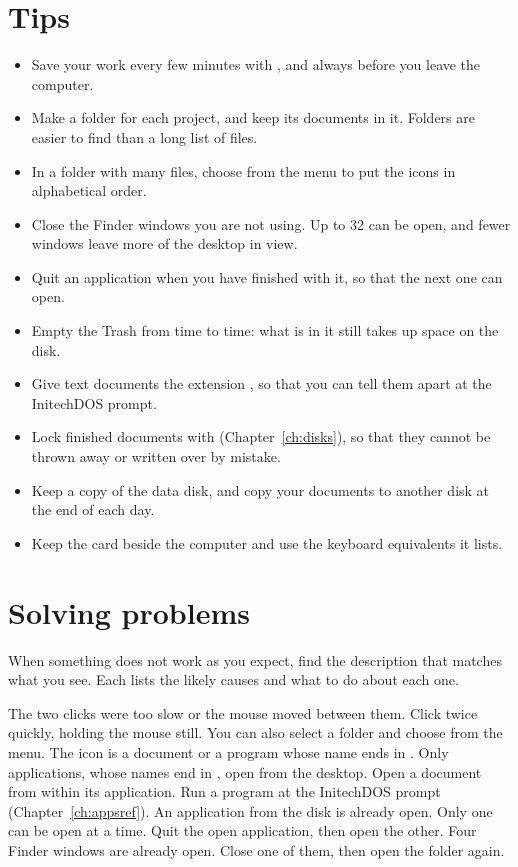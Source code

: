 \section{Tips}
\begin{itemize}
\item Save your work every few minutes with , and always
  before you leave the computer.
\item Make a folder for each project, and keep its documents in it.
  Folders are easier to find than a long list of files.
\item In a folder with many files, choose 
  from the  menu to put the icons in alphabetical order.
\item Close the Finder windows you are not using.  Up to 32 can be
  open, and fewer windows leave more of the desktop in view.
\item Quit an application when you have finished with it, so that the
  next one can open.
\item Empty the Trash from time to time: what is in it still takes up
  space on the disk.
\item Give text documents the extension , so that you can tell
  them apart at the InitechDOS prompt.
\item Lock finished documents with  (Chapter~\ref{ch:disks}),
  so that they cannot be thrown away or written over by mistake.
\item Keep a copy of the data disk, and copy your documents to another
  disk at the end of each day.
\item Keep the  card beside the computer
  and use the keyboard equivalents it lists.
\end{itemize}

\section{Solving problems}
When something does not work as you expect, find the description that
matches what you see.  Each lists the likely causes and what to do about
each one.

\Cause The two clicks were too slow or the mouse moved between them.
\Solution Click twice quickly, holding the mouse still.  You can also
select a folder and choose  from the  menu.
\Cause The icon is a document or a program whose name ends in .
\Solution Only applications, whose names end in , open from the
desktop.  Open a document from within its application.  Run a 
program at the InitechDOS prompt (Chapter~\ref{ch:appsref}).
\Cause An application from the disk is already open.
\Solution Only one can be open at a time.  Quit the open application,
then open the other.
\Cause Four Finder windows are already open.
\Solution Close one of them, then open the folder again.

